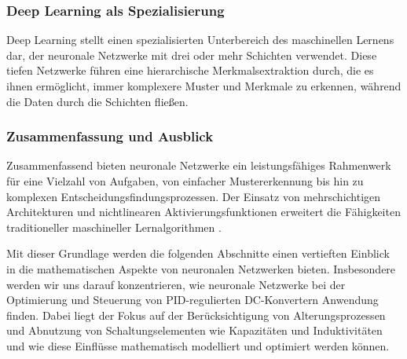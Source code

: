 \subsubsection{Deep Learning als Spezialisierung}
Deep Learning stellt einen spezialisierten Unterbereich des maschinellen Lernens dar, der neuronale Netzwerke mit drei oder mehr Schichten verwendet. Diese tiefen Netzwerke führen eine hierarchische Merkmalsextraktion durch, die es ihnen ermöglicht, immer komplexere Muster und Merkmale zu erkennen, während die Daten durch die Schichten fließen.

\subsubsection{Zusammenfassung und Ausblick}
Zusammenfassend bieten neuronale Netzwerke ein leistungsfähiges Rahmenwerk für eine Vielzahl von Aufgaben, von einfacher Mustererkennung bis hin zu komplexen Entscheidungsfindungsprozessen. Der Einsatz von mehrschichtigen Architekturen und nichtlinearen Aktivierungsfunktionen erweitert die Fähigkeiten traditioneller maschineller Lernalgorithmen \cite[p.~40]{aggarwal_neural_networks_2018}.

Mit dieser Grundlage werden die folgenden Abschnitte einen vertieften Einblick in die mathematischen Aspekte von neuronalen Netzwerken bieten. Insbesondere werden wir uns darauf konzentrieren, wie neuronale Netzwerke bei der Optimierung und Steuerung von PID-regulierten DC-Konvertern Anwendung finden. Dabei liegt der Fokus auf der Berücksichtigung von Alterungsprozessen und Abnutzung von Schaltungselementen wie Kapazitäten und Induktivitäten und wie diese Einflüsse mathematisch modelliert und optimiert werden können.
